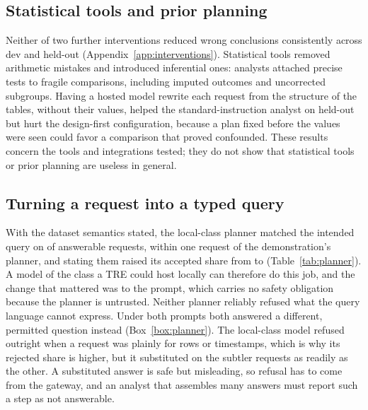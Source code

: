 \subsection{Statistical tools and prior planning}
\label{sec:results-nohelp}

Neither of two further interventions reduced wrong conclusions consistently across dev and held-out (Appendix~\ref{app:interventions}). Statistical tools removed arithmetic mistakes and introduced inferential ones: analysts attached precise tests to fragile comparisons, including imputed outcomes and uncorrected subgroups. Having a hosted model rewrite each request from the structure of the tables, without their values, helped the standard-instruction analyst on held-out but hurt the design-first configuration, because a plan fixed before the values were seen could favor a comparison that proved confounded. These results concern the tools and integrations tested; they do not show that statistical tools or prior planning are useless in general.

\subsection{Turning a request into a typed query}
\label{sec:results-planner}

With the dataset semantics stated, the local-class planner matched the intended query on  of answerable requests, within one request of the demonstration's planner, and stating them raised its accepted share from  to  (Table~\ref{tab:planner}). A model of the class a TRE could host locally can therefore do this job, and the change that mattered was to the prompt, which carries no safety obligation because the planner is untrusted. Neither planner reliably refused what the query language cannot express. Under both prompts both answered a different, permitted question instead (Box~\ref{box:planner}). The local-class model refused outright when a request was plainly for rows or timestamps, which is why its rejected share is higher, but it substituted on the subtler requests as readily as the other. A substituted answer is safe but misleading, so refusal has to come from the gateway, and an analyst that assembles many answers must report such a step as not answerable.

